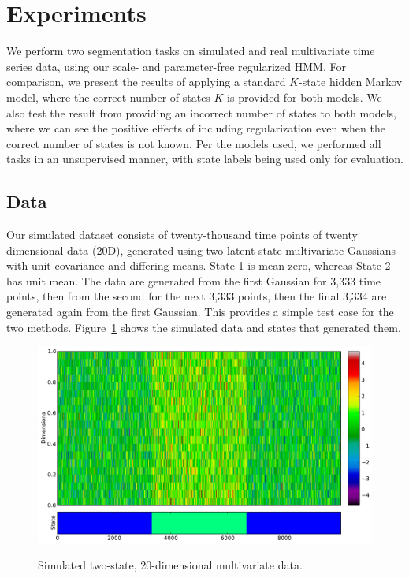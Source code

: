 \documentclass[12pt]{article}
\begin{document}
\section{Experiments}\label{sec:Experiments}

We perform two segmentation tasks on simulated and real multivariate time series data, using our scale- and parameter-free regularized HMM. For comparison, we present the results of applying a standard $K$-state hidden Markov model, where the correct number of states $K$ is provided for both models. We also test the result from providing an incorrect number of states to both models, where we can see the positive effects of including regularization even when the correct number of states is not known. Per the models used, we performed all tasks in an unsupervised manner, with state labels being used only for evaluation.

\subsection{Data}\label{sec:datasets}

Our simulated dataset consists of twenty-thousand time points of twenty dimensional data (20D), generated using two latent state multivariate Gaussians with unit covariance and differing means. State 1 is mean zero, whereas State 2 has unit mean. The data are generated from the first Gaussian for 3,333 time points, then from the second for the next 3,333 points, then the final 3,334 are generated again from the first Gaussian. This provides a simple test case for the two methods. Figure~\ref{fig:simulated} shows the simulated data and states that generated them.

\begin{figure}[htbp]
  \caption{Simulated two-state, 20-dimensional multivariate data.}
  \centering
    \includegraphics[width=1.\linewidth]{images/2-state-simulated-data.pdf}
    \label{fig:simulated}
\end{figure}
\end{document}
